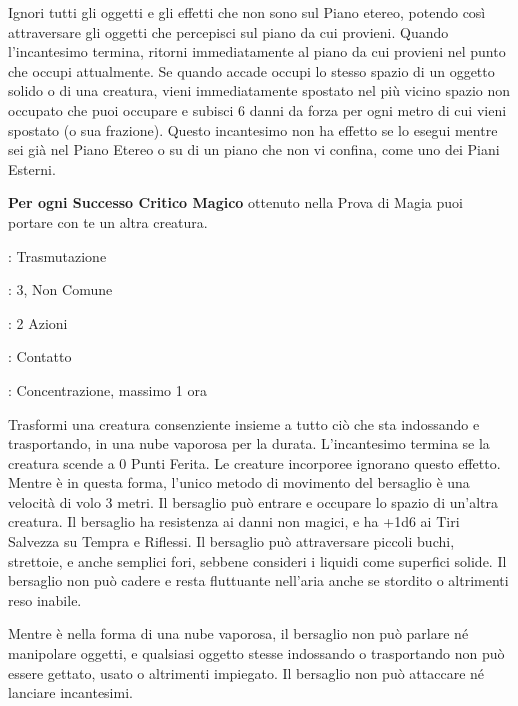 \begin{multicols}{2}
Ignori tutti gli oggetti e gli effetti che non sono sul Piano etereo, potendo così attraversare gli oggetti che percepisci sul piano da cui provieni. Quando l'incantesimo termina, ritorni immediatamente al piano da cui provieni nel punto che occupi attualmente. Se quando accade occupi lo stesso spazio di un oggetto solido o di una creatura, vieni immediatamente spostato nel più vicino spazio non occupato che puoi occupare e subisci 6 danni da forza per ogni metro di cui vieni spostato (o sua frazione). Questo incantesimo non ha effetto se lo esegui mentre sei già nel Piano Etereo o su di un piano che non vi confina, come uno dei Piani Esterni.

\textbf{Per ogni Successo Critico Magico} ottenuto nella Prova di Magia puoi portare con te un altra creatura.

\noindent\colorbox{OBSSgold!10}{
\begin{minipage}{0.95\linewidth}
\begin{description}[noitemsep, topsep=0pt, parsep=0pt, partopsep=0pt, leftmargin=0cm, labelwidth=1.3cm]
	\item[\textbf{Lista}]: Trasmutazione
	\item[\textbf{Livello}]: 3, Non Comune
	\item[\textbf{Lancio}]: 2 Azioni
	\item[\textbf{Gittata}]: Contatto
	\item[\textbf{Durata}]: Concentrazione, massimo 1 ora
\end{description}
\end{minipage}}\smallskip

Trasformi una creatura consenziente insieme a tutto ciò che sta indossando e trasportando, in una nube vaporosa per la durata. L'incantesimo termina se la creatura scende a 0 Punti Ferita. Le creature incorporee ignorano questo effetto. Mentre è in questa forma, l'unico metodo di movimento del bersaglio è una velocità di volo 3 metri. Il bersaglio può entrare e occupare lo spazio di un'altra creatura. Il bersaglio ha resistenza ai danni non magici, e ha +1d6 ai Tiri Salvezza su Tempra e Riflessi. Il bersaglio può attraversare piccoli buchi, strettoie, e anche semplici fori, sebbene consideri i liquidi come superfici solide. Il bersaglio non può cadere e resta fluttuante nell'aria anche se stordito o altrimenti reso inabile.

Mentre è nella forma di una nube vaporosa, il bersaglio non può parlare né manipolare oggetti, e qualsiasi oggetto stesse indossando o trasportando non può essere gettato, usato o altrimenti impiegato. Il bersaglio non può attaccare né lanciare incantesimi.


\end{multicols}
